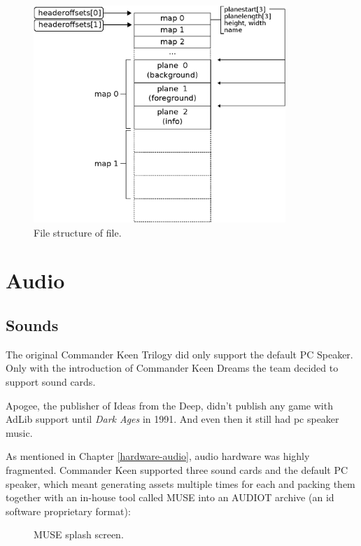 \documentclass[book.tex]{subfiles}
\begin{document}
\par
\begin{minipage}{\textwidth}
 \par
 \end{minipage}
 
\par
\begin{figure}[H]
\centering
 \includegraphics[width=0.85\textwidth]{imgs/drawings/kdreams_map.eps}
 \caption{File structure of  file.}
 \label{fig:map-file}
\end{figure}

\section{Audio}
\subsection{Sounds}
The original Commander Keen Trilogy did only support the default PC Speaker. Only with the introduction of Commander Keen Dreams the team decided to support sound cards.\\

\par
{} Apogee, the publisher of Ideas from the Deep, didn't publish any game with AdLib support until \textit{Dark Ages} in 1991. And even then it still had pc speaker music.\\
\par




As mentioned in Chapter \ref{hardware-audio}, audio hardware was highly fragmented. Commander Keen supported three sound cards and the default PC speaker, which meant generating assets multiple times for each and packing them together with an in-house tool called MUSE into an AUDIOT archive (an id software proprietary format):\\
\begin{figure}[H]
\centering

  \caption{MUSE splash screen.}
 \end{figure}
 \par
 
\end{document}
